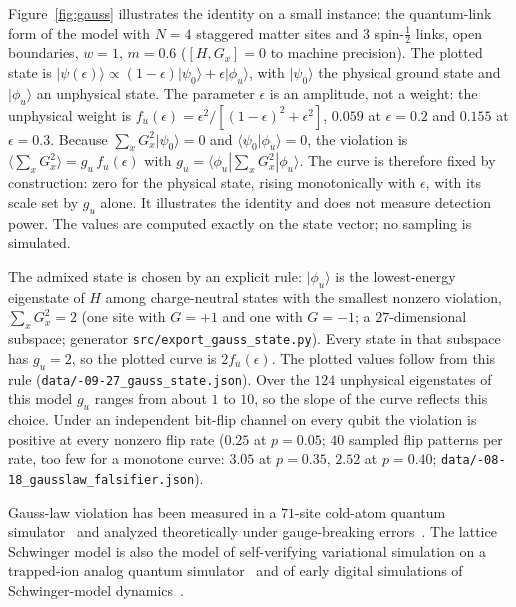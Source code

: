 \documentclass[submission, PhysCore]{SciPost}
\begin{document}
\begin{appendix}
Figure~\ref{fig:gauss} illustrates the identity on a small instance: the quantum-link form of the model with $N=4$ staggered matter sites and $3$ spin-$\tfrac12$ links, open boundaries, $w=1$, $m=0.6$ ($[H,G_x]=0$ to machine precision). The plotted state is $|\psi(\epsilon)\rangle\propto(1-\epsilon)|\psi_0\rangle+\epsilon|\phi_u\rangle$, with $|\psi_0\rangle$ the physical ground state and $|\phi_u\rangle$ an unphysical state. The parameter $\epsilon$ is an amplitude, not a weight: the unphysical weight is $f_u(\epsilon)=\epsilon^2/[(1-\epsilon)^2+\epsilon^2]$, $0.059$ at $\epsilon=0.2$ and $0.155$ at $\epsilon=0.3$. Because $\sum_xG_x^2|\psi_0\rangle=0$ and $\langle\psi_0|\phi_u\rangle=0$, the violation is $\langle\sum_xG_x^2\rangle=g_u\,f_u(\epsilon)$ with $g_u=\langle\phi_u|\sum_xG_x^2|\phi_u\rangle$. The curve is therefore fixed by construction: zero for the physical state, rising monotonically with $\epsilon$, with its scale set by $g_u$ alone. It illustrates the identity and does not measure detection power. The values are computed exactly on the state vector; no sampling is simulated.

The admixed state is chosen by an explicit rule: $|\phi_u\rangle$ is the lowest-energy eigenstate of $H$ among charge-neutral states with the smallest nonzero violation, $\sum_xG_x^2=2$ (one site with $G=+1$ and one with $G=-1$; a $27$-dimensional subspace; generator \texttt{src/\allowbreak export\_gauss\_state.py}). Every state in that subspace has $g_u=2$, so the plotted curve is $2f_u(\epsilon)$. The plotted values follow from this rule (\texttt{data/-09-27\_gauss\_state.json}). Over the $124$ unphysical eigenstates of this model $g_u$ ranges from about $1$ to $10$, so the slope of the curve reflects this choice. Under an independent bit-flip channel on every qubit the violation is positive at every nonzero flip rate ($0.25$ at $p=0.05$; $40$ sampled flip patterns per rate, too few for a monotone curve: $3.05$ at $p=0.35$, $2.52$ at $p=0.40$; \texttt{data/-08-18\_gausslaw\_falsifier.json}).

Gauss-law violation has been measured in a $71$-site cold-atom quantum simulator~\cite{Gauss2020} and analyzed theoretically under gauge-breaking errors~\cite{HalimehHauke2020}. The lattice Schwinger model is also the model of self-verifying variational simulation on a trapped-ion analog quantum simulator~\cite{Kokail2019} and of early digital simulations of Schwinger-model dynamics~\cite{Martinez2016,Klco2018}.


\end{appendix}
\end{document}
